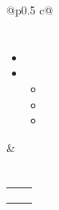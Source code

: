 \documentclass[darkhipster]{hipstercv}
\begin{document}
\begin{paracol}{2}
{\begin{tabular}[t]{@{}p{} c@{}}
{\begin{minipage}[t]{0.5\textwidth}
    \vspace{1em}

    \section{\langMainMisc}
    \small
    \begin{itemize}
      \item \langMainMiscTravels
      \item \langMainMiscOpenSource
      \begin{itemize}
          \item \langMainMiscOpenSourceVaultSecret
          \item \langMainMiscOpenSourceFreenasProv
          \item \langMainMiscOpenSourceYokis
      \end{itemize}
    \end{itemize}

    \end{minipage}
    } & {
    \begin{minipage}[t]{0.19\textwidth}

    \section{\langMainHobbies}
      \begin{tabular}[t]{cc}
      \hobbyicon{\color{iconcolour}\faPlane}{\langMainHobbiesTravel}{cvgreen}{\iconsize}{2em} &
      \hobbyicon{\color{iconcolour}\faCamera}{\langMainHobbiesPhoto}{cvorange}{\iconsize}{2em} \\
      \hobbyicon{\color{iconcolour}\faWrench}{\langMainHobbiesDIY}{cvpurple}{\iconsize}{2em} &
      \hobbyicon{\color{iconcolour}\faChessPawn}{\langMainHobbiesChess}{lightgray}{\iconsize}{2em} \\
      \hobbyicon{\color{iconcolour}\faGamepad}{\langMainHobbiesGames}{red}{\iconsize}{2em} &
      \hobbyicon{\color{iconcolour}\faMountain}{\langMainHobbiesClimbing}{cyan}{\iconsize}{2em} \\
      \end{tabular}
    \end{minipage}
    } \\

  \end{tabular}
} %

\end{paracol}





\end{document}
